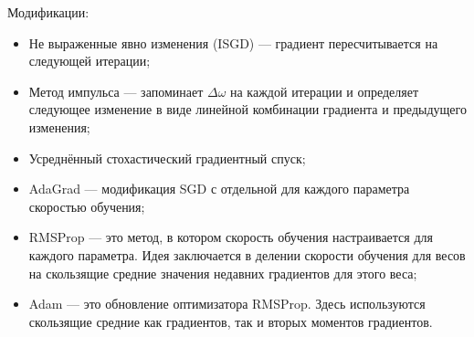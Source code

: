 \documentclass[11pt, oneside]{article}   	%
\begin{document}
Модификации:
\begin{itemize}
	\item Не выраженные явно изменения (ISGD) --- градиент пересчитывается на следующей итерации;
	\item Метод импульса --- запоминает $ \Delta\omega $ на каждой итерации и определяет следующее изменение в виде линейной комбинации градиента и предыдущего изменения;
	\item Усреднённый стохастический градиентный спуск;
	\item AdaGrad --- модификация SGD с отдельной для каждого параметра скоростью обучения;
	\item RMSProp --- это метод, в котором скорость обучения настраивается для каждого параметра. Идея заключается в делении скорости обучения для весов на скользящие средние значения недавних градиентов для этого веса;
	\item Adam --- это обновление оптимизатора RMSProp. Здесь используются скользящие средние как градиентов, так и вторых моментов градиентов.
\end{itemize}















	
\end{document}

